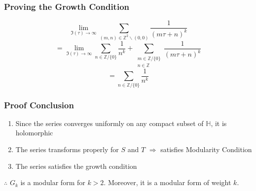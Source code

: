 \documentclass{beamer}
\begin{document}
\begin{frame}
\frametitle{Proving the Growth Condition}
$$\lim_{\Im(\tau) \to \infty} \sum_{(m,n) \in \mathbb{Z}^2 \backslash (0,0)}  \frac{1}{(m \tau + n)^k}$$ 
$$= \lim_{\Im(\tau) \to \infty} \sum_{n \in \mathbb{Z}/ \{0\} } \frac{1}{n^k} + \sum_{\substack{m \in \mathbb{Z}/\{0\} \\ n \in \mathbb{Z}}}  \frac{1}{(m \tau + n)^k}$$
$$ = \sum_{n \in \mathbb{Z}/\{0\}} \frac{1}{n^k} $$
\end{frame}

\begin{frame}
\frametitle{Proof Conclusion}
\begin{enumerate}
\item Since the series converges uniformly on any compact subset of $\mathbb{H}$, it is holomorphic
\item The series transforms properly for $S$ and $T$ $\Rightarrow$ satisfies Modularity Condition
\item The series satisfies the growth condition
\end{enumerate}


$\therefore$ $G_k$ is a modular form for $k > 2$. Moreover, it is a modular form of weight $k$.

\end{frame}
\end{document}
